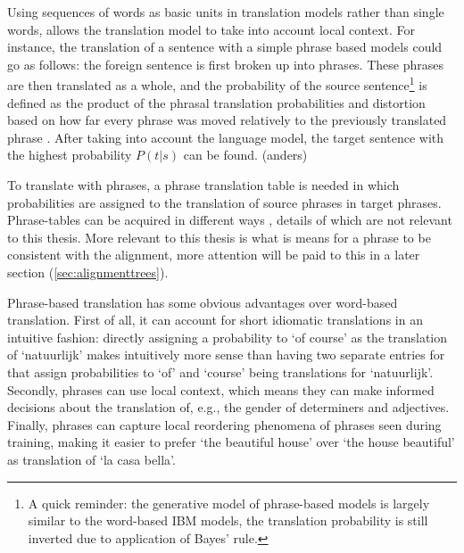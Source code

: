 \documentclass{report}
\theoremstyle{definition}
\theoremstyle{plain}
\begin{document}
Using sequences of words as basic units in translation models rather than single words, allows the translation model to take into account local context. For instance, the translation of a sentence with a simple phrase based models could go as follows: the foreign sentence is first broken up into phrases. These phrases are then translated as a whole, and the probability of the source sentence\footnote{A quick reminder: the generative model of phrase-based models is largely similar to the word-based IBM models, the translation probability is still inverted due to application of Bayes' rule.} is defined as the product of the phrasal translation probabilities and distortion based on how far every phrase was moved relatively to the previously translated phrase \citep{koehn2003statistical}. After taking into account the language model, the target sentence with the highest probability $P(t|s)$ can be found. (anders)

To translate with phrases, a phrase translation table is needed in which probabilities are assigned to the translation of source phrases in target phrases. Phrase-tables can be acquired in different ways \citep{marcu2002phrase,och1999improved,koehn2003statistical}, details of which are not relevant to this thesis. More relevant to this thesis is what is means for a phrase to be consistent with the alignment, more attention will be paid to this in a later section (\ref{sec:alignmenttrees}).

Phrase-based translation has some obvious advantages over word-based translation. First of all, it can account for short idiomatic translations in an intuitive fashion: directly assigning a probability to `of course' as the translation of `natuurlijk' makes intuitively more sense than having two separate entries for that assign probabilities to `of' and `course' being translations for `natuurlijk'. Secondly, phrases can use local context, which means they can make informed decisions about the translation of, e.g., the gender of determiners and adjectives. Finally, phrases can capture local reordering phenomena of phrases seen during training, making it easier to prefer `the beautiful house' over `the house beautiful' as translation of `la casa bella'.
\end{document}

